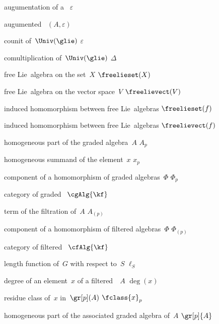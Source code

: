 {augumentation of a~\algebra{$\kf$}}
{$\varepsilon$}

{augumented~\algebra{$\kf$}}
{$(A, \varepsilon)$}

{counit of~$\Univ(\glie)$}
{$\varepsilon$}

{comultiplication of~$\Univ(\glie)$}
{$\Delta$}

{free Lie~algebra on the set~$X$}
{$\freelieset(X)$}

{free Lie~algebra on the vector space~$V$}
{$\freelievect(V)$}

{induced homomorphism between free Lie~algebras}
{$\freelieset(f)$}

{induced homomorphism between free Lie~algebras}
{$\freelievect(f)$}

{ homogeneous part of the graded algebra~$A$}
{$A_p$}

{ homogeneous summand of the element~$x$}
{$x_p$}

{ component of a homomorphism of graded algebras~$\Phi$}
{$\Phi_p$}

{category of graded~\algebras{$\kf$}}
{$\cgAlg{\kf}$}

{ term of the filtration of~$A$}
{$A_{(p)}$}

{ component of a homomorphism of filtered algebras~$\Phi$}
{$\Phi_{(p)}$}

{category of filtered~\algebras{$\kf$}}
{$\cfAlg{\kf}$}

{length function of~$G$ with respect to~$S$}
{$\ell_S$}

{degree of an element~$x$ of a filtered~\algebras{$\kf$}~$A$}
{$\deg(x)$}

{residue class of~$x$ in~$\gr[p](A)$}
{$\fclass{x}_p$}

{ homogeneous part of the associated graded algebra of~$A$}
{$\gr[p]{A}$}

